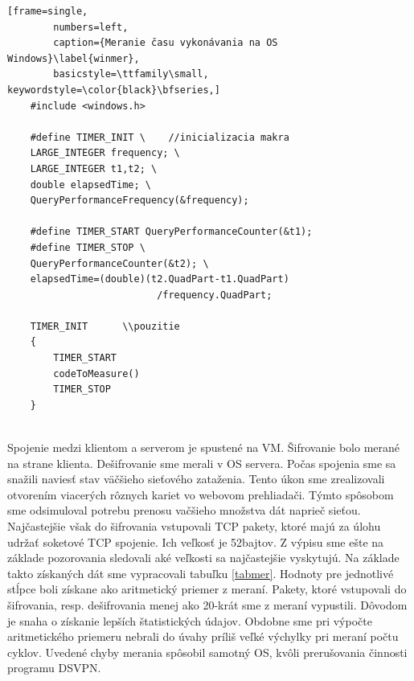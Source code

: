 \begin{minipage}{\linewidth} 	
	\begin{lstlisting}[frame=single,
		numbers=left,
		caption={Meranie času vykonávania na OS Windows}\label{winmer},
		basicstyle=\ttfamily\small, keywordstyle=\color{black}\bfseries,]
	#include <windows.h>
	
	#define TIMER_INIT \	//inicializacia makra
	LARGE_INTEGER frequency; \
	LARGE_INTEGER t1,t2; \
	double elapsedTime; \
	QueryPerformanceFrequency(&frequency);

	#define TIMER_START QueryPerformanceCounter(&t1);
	#define TIMER_STOP \
	QueryPerformanceCounter(&t2); \
	elapsedTime=(double)(t2.QuadPart-t1.QuadPart)
						  /frequency.QuadPart; 	
	
	TIMER_INIT		\\pouzitie	
	{
		TIMER_START
		codeToMeasure()
	 	TIMER_STOP
 	}
	\end{lstlisting}
\end{minipage}\\

Spojenie medzi klientom a serverom je spustené na VM. Šifrovanie bolo merané na strane klienta. Dešifrovanie sme merali v OS servera. Počas spojenia sme sa snažili naviesť stav väčšieho sieťového zataženia. Tento úkon sme zrealizovali otvorením viacerých rôznych kariet vo webovom prehliadači. Týmto spôsobom sme odsimuloval potrebu prenosu vačšieho množstva dát naprieč sieťou. Najčastejšie však do šifrovania vstupovali TCP pakety, ktoré majú za úlohu udržať soketové TCP spojenie. Ich veľkosť je 52bajtov. Z výpisu sme ešte na základe pozorovania sledovali aké veľkosti sa najčastejšie vyskytujú. Na základe takto získaných dát sme vypracovali tabuľku \ref{tabmer}. Hodnoty pre jednotlivé stĺpce boli získane ako aritmetický priemer z meraní. Pakety, ktoré vstupovali do šifrovania, resp. dešifrovania menej ako 20-krát sme z meraní vypustili. Dôvodom je snaha o získanie lepších štatistických údajov. Obdobne sme pri výpočte aritmetického priemeru nebrali do úvahy príliš veľké výchylky pri meraní počtu cyklov. Uvedené chyby merania spôsobil samotný OS, kvôli prerušovania činnosti programu DSVPN.     

